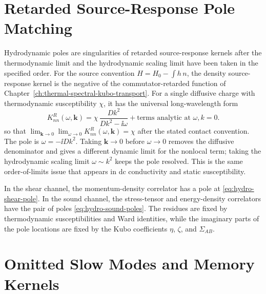 \section{Retarded Source-Response Pole Matching}

Hydrodynamic poles are singularities of retarded source-response kernels
after the thermodynamic limit and the hydrodynamic scaling limit have been
taken in the specified order.  For the source convention
\(H=H_0-\int h\,n\), the density source-response kernel is the negative of
the commutator-retarded function of
Chapter~\ref{ch:thermal-spectral-kubo-transport}.  For a single diffusive
charge with thermodynamic susceptibility \(\chi\), it has the universal
long-wavelength
form
\begin{equation}
  K^R_{nn}(\omega,\mathbf k)
  =
  \chi\,
  \frac{Dk^2}{Dk^2-\ii\omega}
  +\text{terms analytic at }\omega,k=0 .
  \label{eq:hydro-density-retarded-diffusion}
\end{equation}
so that
\(\lim_{\mathbf k\to0}\lim_{\omega\to0}K^R_{nn}(\omega,\mathbf k)=\chi\)
after the stated contact convention.  The pole is \(\omega=-\ii Dk^2\).
Taking \(\mathbf k\to0\) before \(\omega\to0\) removes the diffusive
denominator and gives a different dynamic limit for the nonlocal term; taking
the hydrodynamic scaling limit \(\omega\sim k^2\) keeps the pole resolved.
This is the same order-of-limits issue that appears in dc conductivity and
static susceptibility.

In the shear channel, the momentum-density correlator has a pole at
\eqref{eq:hydro-shear-pole}.  In the sound channel, the stress-tensor and
energy-density correlators have the pair of poles
\eqref{eq:hydro-sound-poles}.  The residues are fixed by thermodynamic
susceptibilities and Ward identities, while the imaginary parts of the pole
locations are fixed by the Kubo coefficients \(\eta\), \(\zeta\), and
\(\Sigma_{AB}\).

\section{Omitted Slow Modes and Memory Kernels}
\label{sec:hydro-omitted-slow-mode-memory}

